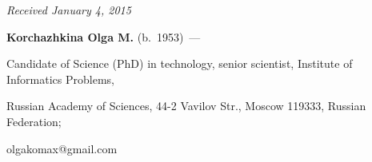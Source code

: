 \hfill{\small\textit{Received January 4, 2015}}










   \Contrl





   \noindent


   \textbf{Korchazhkina Olga M.} (b.\ 1953)~---


   Candidate of Science (PhD) in technology, senior scientist, Institute of Informatics Problems,


Russian Academy of Sciences, 44-2 Vavilov Str., Moscow 119333, Russian Federation;


olgakomax@gmail.com





\label{end\stat}





\renewcommand{\bibname}{\protect\rm Литература}


